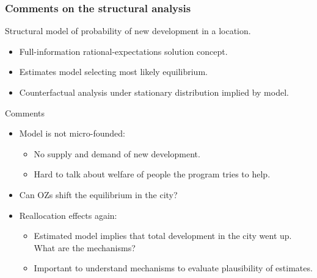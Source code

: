 \documentclass[aspectratio=169, t]{beamer}
\begin{document}
\begin{frame}
    \frametitle{Comments on the structural analysis}
    
    Structural model of probability of new development in a location.
    \begin{itemize}
        \item Full-information rational-expectations solution concept.
        \item Estimates model selecting most likely equilibrium.
        \item Counterfactual analysis under stationary distribution implied by model.
    \end{itemize}

    \pause
    \vspace{2mm}
    Comments
    \begin{itemize}
        \vspace{1mm}
        \item Model is not micro-founded:
        \begin{itemize}
            \item No supply and demand of new development.
            \item Hard to talk about welfare of people the program tries to help.
        \end{itemize}
        \pause
        \vspace{1mm}
        \item Can OZs shift the equilibrium in the city?
        \pause
        \vspace{1mm}
        \item Reallocation effects again:
        \begin{itemize}
            \item Estimated model implies that total development in the city went up. What are the mechanisms?
            \item Important to understand mechanisms to evaluate plausibility of estimates.
        \end{itemize}
    \end{itemize}
\end{frame}
\end{document}
